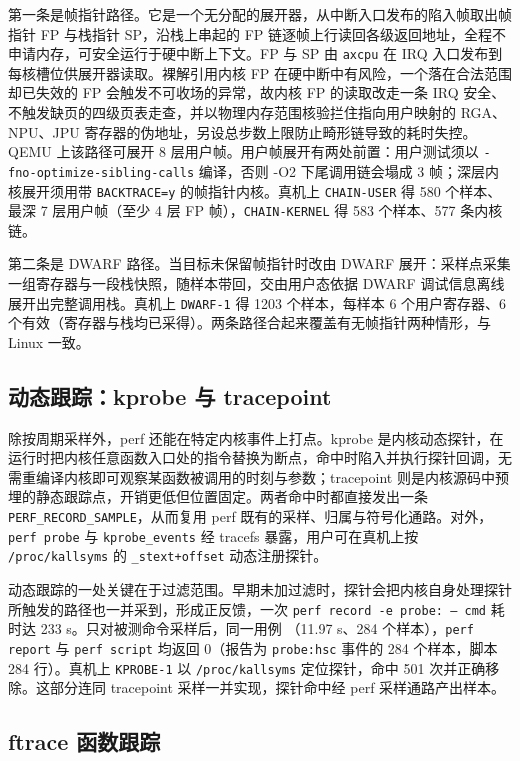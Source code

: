 第一条是帧指针路径。它是一个无分配的展开器，从中断入口发布的陷入帧取出帧指针 FP 与栈指针 SP，沿栈上串起的 FP 链逐帧上行读回各级返回地址，全程不申请内存，可安全运行于硬中断上下文。FP 与 SP 由 \texttt{axcpu} 在 IRQ 入口发布到每核槽位供展开器读取。裸解引用内核 FP 在硬中断中有风险，一个落在合法范围却已失效的 FP 会触发不可收场的异常，故内核 FP 的读取改走一条 IRQ 安全、不触发缺页的四级页表走查，并以物理内存范围核验拦住指向用户映射的 RGA、NPU、JPU 寄存器的伪地址，另设总步数上限防止畸形链导致的耗时失控。QEMU 上该路径可展开 8 层用户帧。用户帧展开有两处前置：用户测试须以 \texttt{-fno-optimize-sibling-calls} 编译，否则 -O2 下尾调用链会塌成 3 帧；深层内核展开须用带 \texttt{BACKTRACE=y} 的帧指针内核。真机上 \texttt{CHAIN-USER} 得 580 个样本、最深 7 层用户帧（至少 4 层 FP 帧），\texttt{CHAIN-KERNEL} 得 583 个样本、577 条内核链。

第二条是 DWARF 路径。当目标未保留帧指针时改由 DWARF 展开：采样点采集一组寄存器与一段栈快照，随样本带回，交由用户态依据 DWARF 调试信息离线展开出完整调用栈。真机上 \texttt{DWARF-1} 得 1203 个样本，每样本 6 个用户寄存器、6 个有效（寄存器与栈均已采得）。两条路径合起来覆盖有无帧指针两种情形，与 Linux 一致。

\subsection{动态跟踪：kprobe 与 tracepoint}

除按周期采样外，perf 还能在特定内核事件上打点。kprobe 是内核动态探针，在运行时把内核任意函数入口处的指令替换为断点，命中时陷入并执行探针回调，无需重编译内核即可观察某函数被调用的时刻与参数；tracepoint 则是内核源码中预埋的静态跟踪点，开销更低但位置固定。两者命中时都直接发出一条 \texttt{PERF\_RECORD\_SAMPLE}，从而复用 perf 既有的采样、归属与符号化通路。对外，\texttt{perf probe} 与 \texttt{kprobe\_events} 经 tracefs 暴露，用户可在真机上按 \texttt{/proc/kallsyms} 的 \texttt{\_stext+offset} 动态注册探针。

动态跟踪的一处关键在于过滤范围。早期未加过滤时，探针会把内核自身处理探针所触发的路径也一并采到，形成正反馈，一次 \texttt{perf record -e probe: -- cmd} 耗时达 233 s。只对被测命令采样后，同一用例 （11.97 s、284 个样本），\texttt{perf report} 与 \texttt{perf script} 均返回 0（报告为 \texttt{probe:hsc} 事件的 284 个样本，脚本 284 行）。真机上 \texttt{KPROBE-1} 以 \texttt{/proc/kallsyms} 定位探针，命中 501 次并正确移除。这部分连同 tracepoint 采样一并实现，探针命中经 perf 采样通路产出样本。

\subsection{ftrace 函数跟踪}

